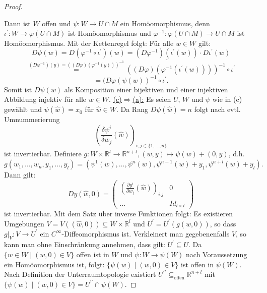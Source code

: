 \documentclass[a4paper,11pt,notitlepage]{report}
\theoremstyle{definition}
\newcommand{\R}{{\ensuremath{\mathbb{R}}}}
\begin{document}
\begin{proof}
\begin{center}
\end{center}
		 Dann ist $W$ offen und $\psi \colon W \rightarrow U \cap M$ ein Homöomorphismus, denn $\iota^\prime \colon W \rightarrow \varphi(U \cap M)$ ist Homöomorphismus und $\varphi^{-1} \colon \varphi(U \cap M) \rightarrow U \cap M$ ist Homöomorphismus.
		 \newline
		 Mit der Kettenregel folgt: Für alle $w \in W$ gilt:
		 $$D \psi(w) = D(\varphi^{-1} \circ \iota^\prime)(w) = \underline{(D \varphi^{-1}) (\iota^\prime(w))} \cdot D\iota^\prime (w)$$ 
		 $$\overset{(D \varphi^{-1})(y) = ((D \varphi)(\varphi^{-1}(y)))^{-1}}{=} ((D \varphi) (\varphi^{-1}(\iota^\prime(w))))^{-1} \circ \iota^\prime$$
		 $$= (D \varphi ( \psi(w))^{-1} \circ \iota^\prime.$$
		 Somit ist $D \psi(w)$ als Komposition einer bijektiven und einer injektiven Abbildung injektiv für alle $w \in W$.
		 \newline
		 \underline{(c)$\Rightarrow$(a):} Es seien $U$, $W$ und $\psi$ wie in (c) gewählt und $\psi(\hat{w})= x_0$ für $\hat{w} \in W$.
		 Da Rang $D \psi(\hat{w}) = n$ folgt nach evtl. Umnummerierung
		 $$\left(\frac{\delta \psi^i}{\delta w_j}(\hat{w})\right)_{i,j \in \{1, \ldots, n\}}$$ ist invertierbar.
		 Definiere $g \colon W \times \R^l \rightarrow \R^{n+l}, (w,y) \mapsto \psi(w) + (0,y)$, d.h. $g(w_1, \ldots,w_n,y_1,\ldots,y_l) = (\psi^1(w), \ldots, \psi^n(w), \psi^{n+1}(w)+y_1, \psi^{n+l}(w)+y_l).$
		 Dann gilt: 
		 \[
		 Dy(\hat{w},0) = 
		 \left(
		\begin{array}{c|c}
		\left( \frac{\partial y^i}{\partial w_j}\left( \hat{w} \right) \right)_{i.j} & 0 \\ \hline
		\hdots & Id_{l \times l}
		\end{array}
		\right)
		 \]
		 ist invertierbar.
		 Mit dem Satz über inverse Funktionen folgt:
		 Es existieren Umgebungen $V = V((\hat{w},0)) \subseteq W \times \R^l$ und $U^\prime = U^\prime(g(\hat{w},0))$, so dass $g \big |_V \colon V \rightarrow U^\prime$ ein $C^\infty$-Diffeomorphismus ist. \newline
		 Verkleinert man gegebenenfalls $V$, so kann man ohne Einschränkung annehmen, dass gilt: $U^\prime \subseteq U$.
		 Da $\{w \in W \mid (w,0) \in V\}$ offen ist in $W$ und $\psi \colon W \rightarrow \psi(W)$ nach Voraussetzung ein Homöomorphismus ist, folgt: $\{\psi(w) \mid (w,0) \in V\}$ ist offen in $\psi(W)$.
		 \newline
		 Nach Definition der Unterraumtopologie existiert $U^{\prime\prime} \subseteq_{\text{offen}} \R^{n+l}$ mit $\{\psi(w)\mid(w,0) \in V\} = U^{\prime\prime} \cap \psi(W)$.

\end{proof}
\end{document}
